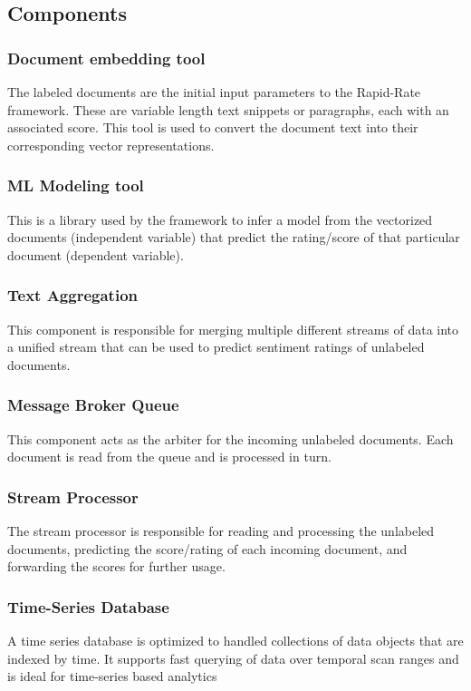 \documentclass[conference]{IEEEtran}
\begin{document}
    \subsection{Components} \label{Components}

        \subsubsection{Document embedding tool}
            The labeled documents are the initial input parameters to the Rapid-Rate framework. These are variable length text snippets or paragraphs, each with an associated score. This tool is used to convert the document text into their corresponding vector representations.

        \subsubsection{ML Modeling tool}
            This is a library used by the framework to infer a model from the vectorized documents (independent variable) that predict the rating/score of that particular document (dependent variable). 

        \subsubsection{Text Aggregation}
            This component is responsible for merging multiple different streams of data into a unified stream that can be used to predict sentiment ratings of unlabeled documents.

        \subsubsection{Message Broker Queue}
            This component acts as the arbiter for the incoming unlabeled documents. 
            Each document is read from the queue and is processed in turn.

        \subsubsection{Stream Processor}
            The stream processor is responsible for reading and processing the unlabeled documents, predicting the score/rating of each incoming document, and forwarding the scores for further usage.

        \subsubsection{Time-Series Database}
            A time series database is optimized to handled collections of data objects that are indexed by time. 
            It supports fast querying of data over temporal scan ranges and is ideal for time-series based analytics
\end{document}
